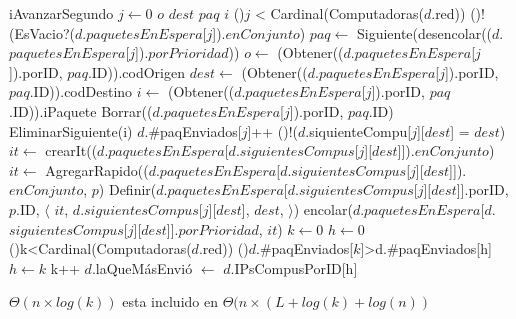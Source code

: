 \begin{Algoritmos}
  \begin{algoritmo}{iAvanzarSegundo}{}{}
     $j \gets 0$
     $o$
     $dest$
     $paq$
     $i$ 
    \While(){$j$ < Cardinal(Computadoras($d$.red))}{
      \If(){!(EsVacio?($d$.$paquetesEnEspera$[$j$]).$enConjunto$)}{
        $paq \gets$ Siguiente(desencolar(($d$.$paquetesEnEspera$[$j$]).$porPrioridad$))
        $o \gets$ (Obtener(($d$.$paquetesEnEspera$[$j$]).porID, $paq$.ID)).codOrigen
        $dest \gets$ (Obtener(($d$.$paquetesEnEspera$[$j$]).porID, $paq$.ID)).codDestino
        $i \gets$ (Obtener(($d$.$paquetesEnEspera$[$j$]).porID, $paq$.ID)).iPaquete
        Borrar(($d$.$paquetesEnEspera$[$j$]).porID, $paq$.ID)
        EliminarSiguiente(i)
        $d$.\#paqEnviados[$j$]++
        \If(){!($d$.siquienteCompu[$j$][$dest$] = $dest$)}{
           $it \gets$ crearIt(($d$.$paquetesEnEspera$[$d$.$siguientesCompus$[$j$][$dest$]]).$enConjunto$)
          $it \gets$ AgregarRapido(($d$.$paquetesEnEspera$[$d$.$siguientesCompus$[$j$][$dest$]]).$enConjunto$, $p$)
          Definir($d$.$paquetesEnEspera$[$d$.$siguientesCompus$[$j$][$dest$]].porID, $p$.ID, $\langle$ $it$, $d$.$siguientesCompus$[$j$][$dest$], $dest$, $\rangle$)
          encolar($d$.$paquetesEnEspera$[$d$.$siguientesCompus$[$j$][$dest$]].$porPrioridad$, $it$)
        }
      }
    }
     $k \gets 0$
     $h \gets 0$
      \While(){k<Cardinal(Computadoras($d$.red))}{
        \If(){$d$.\#paqEnviados[$k$]>d.\#paqEnviados[h]}{
          $h \gets k$
          k++
        }
    }
    $d$.laQueM\'asEnvi\'o $\gets$ $d$.IPsCompusPorID[h]
  \end{algoritmo}
  \datosAlgoritmo{} %
  {} %
  {} %
  {$\Theta(n \times log(k))$ esta incluido en $\Theta(n \times (L+log(k)+log(n))$} %
  {} %



\end{Algoritmos}
